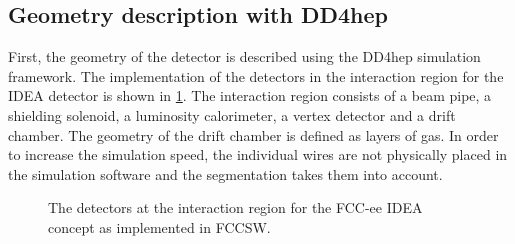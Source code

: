\documentclass[conference]{IEEEtran}
\begin{document}
\subsection{Geometry description with DD4hep}
First, the geometry of the detector is described using the DD4hep simulation framework. The implementation of the detectors in the interaction region for the IDEA detector is shown in \cref{fig_sim}. The interaction region consists of a beam pipe, a shielding solenoid, a luminosity calorimeter, a vertex detector and a drift chamber. The geometry of the drift chamber is defined as layers of gas. In order to increase the simulation speed, the individual wires are not physically placed in the simulation software and the segmentation takes them into account.

\begin{figure}[!t]
\centering

\caption{The detectors at the interaction region for the FCC-ee IDEA concept as implemented in FCCSW.}
\label{fig_sim}
\end{figure}
\end{document}
